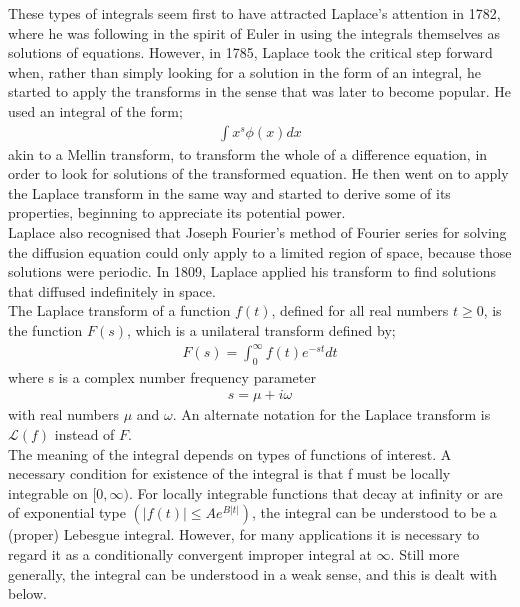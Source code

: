 \documentclass[11pt]{report}
\newcommand{\Laplace}{\mathcal{L}}
\newcommand{\NI}{\noindent}
\begin{document}
	\NI These types of integrals seem first to have attracted Laplace's attention in 1782, where he was following in the spirit of Euler in using the integrals themselves as solutions of equations. However, in 1785, Laplace took the critical step forward when, rather than simply looking for a solution in the form of an integral, he started to apply the transforms in the sense that was later to become popular. He used an integral of the form;
	\begin{eqnarray}
		\int x^s \phi (x) dx
	\end{eqnarray}
	akin to a Mellin transform, to transform the whole of a difference equation, in order to look for solutions of the transformed equation. He then went on to apply the Laplace transform in the same way and started to derive some of its properties, beginning to appreciate its potential power.\\
	
	\NI Laplace also recognised that Joseph Fourier's method of Fourier series for solving the diffusion equation could only apply to a limited region of space, because those solutions were periodic. In 1809, Laplace applied his transform to find solutions that diffused indefinitely in space.\\
	
	\NI The Laplace transform of a function $f(t)$, defined for all real numbers $t \geq 0$, is the function $F(s)$, which is a unilateral transform defined by;
	\begin{eqnarray}
		F(s) =\int_{0}^{\infty} f(t)e^{-st}dt
	\end{eqnarray}
	where s is a complex number frequency parameter
	\begin{eqnarray}
		s = \mu + i\omega
	\end{eqnarray}
	with real numbers $\mu$ and $\omega$. An alternate notation for the Laplace transform is $\Laplace(f)$ instead of $F$.\\
	
	\NI The meaning of the integral depends on types of functions of interest. A necessary condition for existence of the integral is that f must be locally integrable on $[0, \infty)$. For locally integrable functions that decay at infinity or are of exponential type $(|f(t)| \leq Ae^{B|t|})$, the integral can be understood to be a (proper) Lebesgue integral. However, for many applications it is necessary to regard it as a conditionally convergent improper integral at $\infty$. Still more generally, the integral can be understood in a weak sense, and this is dealt with below.\\
	
\end{document}
